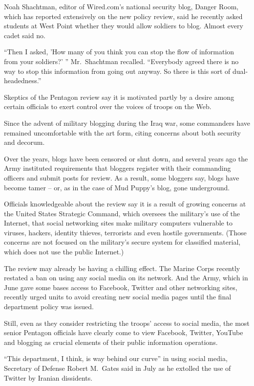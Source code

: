 ﻿\documentclass[12pt]{article}
\begin{document}
Noah Shachtman, editor of Wired.com's national security blog, Danger Room, which has reported
extensively on the new policy review, said he recently asked students at West Point whether they
would allow soldiers to blog. Almost every cadet said no.

``Then I asked, 'How many of you think you can stop the flow of information from your soldiers?' ''
Mr.~Shachtman recalled. ``Everybody agreed there is no way to stop this information from going out
anyway. So there is this sort of dual-headedness.''

Skeptics of the Pentagon review say it is motivated partly by a desire among certain officials to
exert control over the voices of troops on the Web.

Since the advent of military blogging during the Iraq war, some commanders have remained
uncomfortable with the art form, citing concerns about both security and decorum.

Over the years, blogs have been censored or shut down, and several years ago the Army instituted
requirements that bloggers register with their commanding officers and submit posts for review. As a
result, some bloggers say, blogs have become tamer -- or, as in the case of Mud Puppy's blog, gone
underground.

Officials knowledgeable about the review say it is a result of growing concerns at the United States
Strategic Command, which oversees the military's use of the Internet, that social networking sites
make military computers vulnerable to viruses, hackers, identity thieves, terrorists and even
hostile governments. (Those concerns are not focused on the military's secure system for classified
material, which does not use the public Internet.)

The review may already be having a chilling effect. The Marine Corps recently restated a ban on
using any social media on its network. And the Army, which in June gave some bases access to
Facebook, Twitter and other networking sites, recently urged units to avoid creating new social
media pages until the final department policy was issued.

Still, even as they consider restricting the troops' access to social media, the most senior
Pentagon officials have clearly come to view Facebook, Twitter, YouTube and blogging as crucial
elements of their public information operations.

``This department, I think, is way behind our curve'' in using social media, Secretary of Defense
Robert M.~Gates said in July as he extolled the use of Twitter by Iranian dissidents.
\end{document}
